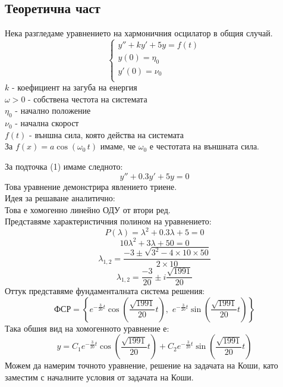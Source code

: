 \documentclass[11pt]{article}
\begin{document}
\subsection{Теоретична част}
\begin{flushleft}
    Нека разгледаме уравнението на хармоничния осцилатор в общия случай. 
    $$
    \begin{cases}
        y'' + ky' + 5y = f(t) \\
        y(0) = \eta_0 \\
        y'(0) = \nu_0 \\
    \end{cases}
    $$
    $k$ - коефициент на загуба на енергия \\
    $\omega > 0$ - собствена честота на системата \\
    $\eta_0$ - начално положение \\
    $\nu_0$ - начална скорост \\
    $f(t)$ - външна сила, която действа на системата \\
    За $f(x) = a \cos(\omega_0 \, t)$ имаме, че $\omega_0$ е честотата на външната сила. \\
    \vspace{0.35cm}

    За подточка (1) имаме следното:
    $$y'' + 0.3y' + 5y = 0$$
    Това уравнение демонстрира явлението триене. \\
    \vspace{0.25cm}
    Идея за решаване аналитично: \\
    \vspace{0.20cm}
    Това е хомогенно линейно ОДУ от втори ред. \\
    Представяме характеристичния полином на уравнението:
    $$P(\lambda) = \lambda^2 + 0.3\lambda + 5 = 0$$
    $$10\lambda^2 + 3\lambda + 50 = 0$$
    $$\lambda_{1,2} = \dfrac{-3 \pm \sqrt{3^2 - 4 \times 10 \times 50}}{2 \times 10}$$
    $$\lambda_{1,2} = \dfrac{-3}{20} \pm i \dfrac{\sqrt{1991}}{20}$$
    Оттук представяме фундаменталната система решения:
    $$
    \text{ФСР} = \left\{e^{-\frac{3}{20}t}\cos\left(\dfrac{\sqrt{1991}}{20}t\right), \,\,
        e^{-\frac{3}{20}t}\sin\left(\dfrac{\sqrt{1991}}{20}t\right)\right\}
    $$
    Така обшия вид на хомогенното уравнение е: \\
    $$
    y = C_1 e^{-\frac{3}{20}t}\cos\left(\dfrac{\sqrt{1991}}{20}t\right) +
        C_2 e^{-\frac{3}{20}t}\sin\left(\dfrac{\sqrt{1991}}{20}t\right)
    $$
    Можем да намерим точното уравнение, решение на задачата на Коши, като заместим с началните условия от задачата на Коши. \\


\end{flushleft}
\end{document}
